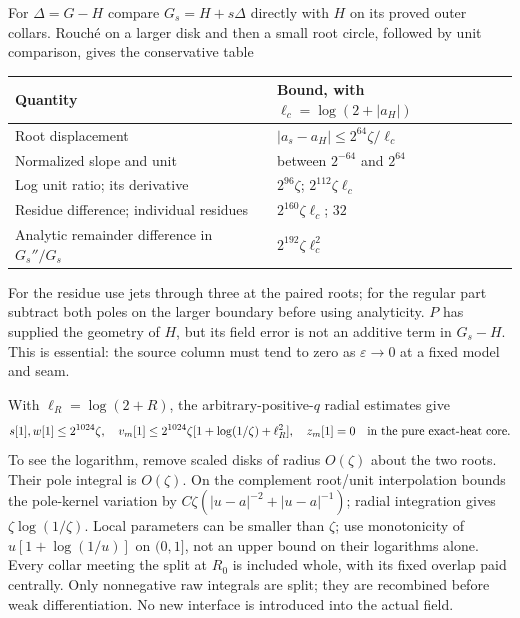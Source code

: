 For $\Delta=G-H$ compare $G_s=H+s\Delta$ directly with $H$ on
its proved outer collars. Rouch\'e on a larger disk and then a small
root circle, followed by unit comparison, gives the conservative table
\begin{center}\small
\begin{tabular}{@{}ll@{}}\toprule
Quantity & Bound, with $\ell_c=\log(2+|a_H|)$\\\midrule
Root displacement & $|a_s-a_H|\le2^{64}\zeta/\ell_c$\\
Normalized slope and unit & between $2^{-64}$ and $2^{64}$\\
Log unit ratio; its derivative & $2^{96}\zeta$; $2^{112}\zeta\ell_c$\\
Residue difference; individual residues & $2^{160}\zeta\ell_c$; $32$\\
Analytic remainder difference in $G_s''/G_s$ & $2^{192}\zeta\ell_c^2$\\\bottomrule
\end{tabular}\end{center}
For the residue use jets through three at the paired roots; for the
regular part subtract both poles on the larger boundary before using
analyticity. $P$ has supplied the geometry of $H$, but its field error
is not an additive term in $G_s-H$. This is essential: the source column
must tend to zero as $\varepsilon\to0$ at a fixed model and seam.

With $\ell_R=\log(2+R)$, the arbitrary-positive-$q$ radial estimates give
\begin{equation}
 s[1],w[1]\le2^{1024}\zeta,\quad
 v_m[1]\le2^{1024}\zeta[1+\log(1/\zeta)+\ell_R^2],\quad
 z_m[1]=0\quad\hbox{in the pure exact-heat core}.
 \label{eq:sc-primitives}
\end{equation}
To see the logarithm, remove scaled disks of radius $O(\zeta)$ about
the two roots. Their pole integral is $O(\zeta)$. On the complement
root/unit interpolation bounds the pole-kernel variation by
$C\zeta(|u-a|^{-2}+|u-a|^{-1})$; radial integration gives
$\zeta\log(1/\zeta)$. Local parameters can be smaller than $\zeta$;
use monotonicity of $u[1+\log(1/u)]$ on $(0,1]$, not an upper bound
on their logarithms alone.
Every collar meeting the split at $R_0$ is included whole, with its
fixed overlap paid centrally. Only nonnegative raw integrals are split;
they are recombined before weak differentiation. No new interface is
introduced into the actual field.

